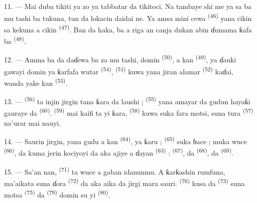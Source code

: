 11. --- Mai duba tikiti ya zo ya tabbatar da tikitoci. Na tambaye shi
me ya sa ba mu tashi ba tukuna, tun da lokacin daidai ne. Ya amsa mini
cewa  \textsuperscript{(46)} yana cikin sa kekuna a
cikin  \textsuperscript{(47)}. Ban da haka, ba a riga an
canja dukan abin ɗumama ƙafa ba \textsuperscript{(48)}.

12. --- Amma ba da daɗewa ba za mu tashi, domin 
\textsuperscript{(50)}, a kan 
\textsuperscript{(49)}, ya ɗauki gawayi domin ya ƙarfafa wutar
 \textsuperscript{(54)}, 
\textsuperscript{(51)} kuwa yana jiran alamar  \textsuperscript{(52)} kaɗai, wanda yake kan 
\textsuperscript{(53)}.

13. ---  \textsuperscript{(56)} ta injin jirgin
tana ƙara da laushi ;  \textsuperscript{(55)} yana
amayar da gudun hayaƙi gauraye da 
\textsuperscript{(60)}.  \textsuperscript{(59)} mai kaifi ta yi
ƙara,  \textsuperscript{(58)} kuwa suka fara motsi,
suna tura  \textsuperscript{(57)} na’urar mai nauyi.

\VUsaut{3.0mm}
\VUsaut{3.0mm}

14. --- Saurin jirgin, yana gudu a kan 
\textsuperscript{(64)}, ya ƙaru ;  \textsuperscript{(65)} suka
ɓace ; muka wuce  \textsuperscript{(66)}, da kuma jerin
kociyoyi da aka ajiye a ɗayan  \textsuperscript{(63)} :
 \textsuperscript{(67)}, da 
\textsuperscript{(68)}, da  \textsuperscript{(69)}.


15. --- Sa’an nan,  \textsuperscript{(71)} ta wuce a
gaban idanunmu. A ƙarƙashin rumfuna, ma’aikata suna ɗora
 \textsuperscript{(72)} da aka aika da jirgi mara sauri.
 \textsuperscript{(76)} kusa da 
\textsuperscript{(73)} suna motsa 
\textsuperscript{(75)} da 
\textsuperscript{(79)} domin su yi 
\textsuperscript{(80)}.

